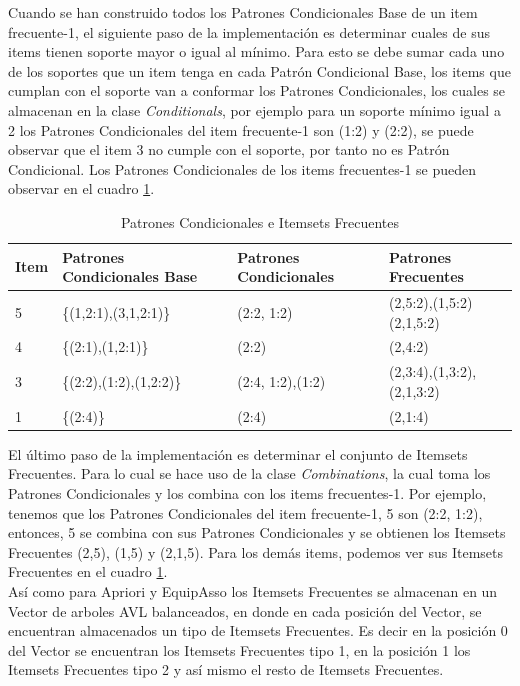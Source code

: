 Cuando se han construido todos los Patrones Condicionales Base de un item frecuente-1, el siguiente paso de la
implementaci\'on es determinar cuales de sus items tienen soporte mayor o igual al m\'inimo. Para esto se debe 
sumar cada uno de los soportes que un item tenga en cada Patr\'on Condicional Base, los items que cumplan con el
soporte van a conformar los Patrones Condicionales, los cuales se almacenan en la clase \textit{Conditionals},
por ejemplo para un soporte m\'inimo igual a 2 los Patrones Condicionales del item frecuente-1 son (1:2) y (2:2),
se puede observar que el item 3 no cumple con el soporte, por tanto no es Patr\'on Condicional. Los Patrones
Condicionales de los items frecuentes-1 se pueden observar en el cuadro \ref{pcb}.\\

\begin{table}[h]
\begin{center}
\begin{tabular}{|p{9mm}|p{35mm}|p{30mm}|p{40mm}|}\hline
\textbf{Item} & \textbf{Patrones Condicionales Base} & \textbf{Patrones Condicionales} & \textbf{Patrones
Frecuentes}\\ \hline\hline
5 & \{(1,2:1),(3,1,2:1)\}   & (2:2, 1:2)     & (2,5:2),(1,5:2)(2,1,5:2)\\ \hline
4 & \{(2:1),(1,2:1)\}     & (2:2)      & (2,4:2)\\ \hline
3 & \{(2:2),(1:2),(1,2:2)\} & (2:4, 1:2),(1:2) & (2,3:4),(1,3:2),(2,1,3:2)\\ \hline
1 & \{(2:4)\}         & (2:4)      & (2,1:4)\\ \hline
\end{tabular}
\end{center}
\caption{Patrones Condicionales e Itemsets Frecuentes}
\label{pcb}
\end{table}

El \'ultimo paso de la implementaci\'on es determinar el conjunto de Itemsets Frecuentes. Para lo cual se hace 
uso de la clase \textit{Combinations}, la cual toma los Patrones Condicionales y los combina con los items 
frecuentes-1. Por ejemplo, tenemos que los Patrones Condicionales del item frecuente-1, 5 son (2:2, 1:2),
entonces, 5 se combina con sus Patrones Condicionales y se obtienen los Itemsets Frecuentes (2,5), (1,5) y
(2,1,5). Para los dem\'as items, podemos ver sus Itemsets Frecuentes en el cuadro \ref{pcb}.\\

As\'i como para Apriori y EquipAsso los Itemsets Frecuentes se almacenan en un Vector de arboles AVL balanceados, 
en donde en cada posici\'on del Vector, se encuentran almacenados un tipo de Itemsets Frecuentes. Es decir en la 
posici\'on 0 del Vector se encuentran los Itemsets Frecuentes tipo 1, en la posici\'on 1 los Itemsets Frecuentes 
tipo 2 y as\'i mismo el resto de Itemsets Frecuentes.
